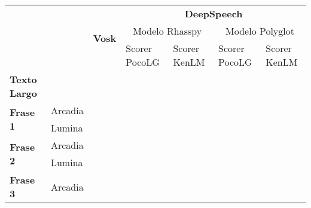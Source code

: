 \documentclass{article}
\begin{document}
	\begin{landscape}
		\begin{table}[]
			\begin{tabular}{|ll|l|llll|}
				\hline
				\multicolumn{2}{|l|}{\multirow{3}{*}{}}                           & \multirow{3}{*}{\textbf{Vosk}} & \multicolumn{4}{c|}{\textbf{DeepSpeech}}                                                                                   \\ \cline{4-7} 
				\multicolumn{2}{|l|}{}                                            &                                & \multicolumn{2}{c|}{Modelo Rhasspy}                                    & \multicolumn{2}{c|}{Modelo Polyglot}              \\ \cline{4-7} 
				\multicolumn{2}{|l|}{}                                            &                                & \multicolumn{1}{l|}{Scorer PocoLG} & \multicolumn{1}{l|}{Scorer KenLM} & \multicolumn{1}{l|}{Scorer PocoLG} & Scorer KenLM \\ \hline
				\multicolumn{1}{|l|}{\textbf{Texto Largo}}              &         &                                & \multicolumn{1}{l|}{}              & \multicolumn{1}{l|}{}             & \multicolumn{1}{l|}{}              &              \\ \hline
				\multicolumn{1}{|l|}{\multirow{2}{*}{\textbf{Frase 1}}} & Arcadia &                                & \multicolumn{1}{l|}{}              & \multicolumn{1}{l|}{}             & \multicolumn{1}{l|}{}              &              \\ \cline{2-7} 
				\multicolumn{1}{|l|}{}                                  & Lumina  &                                & \multicolumn{1}{l|}{}              & \multicolumn{1}{l|}{}             & \multicolumn{1}{l|}{}              &              \\ \hline
				\multicolumn{1}{|l|}{\multirow{2}{*}{\textbf{Frase 2}}} & Arcadia &                                & \multicolumn{1}{l|}{}              & \multicolumn{1}{l|}{}             & \multicolumn{1}{l|}{}              &              \\ \cline{2-7} 
				\multicolumn{1}{|l|}{}                                  & Lumina  &                                & \multicolumn{1}{l|}{}              & \multicolumn{1}{l|}{}             & \multicolumn{1}{l|}{}              &              \\ \hline
				\multicolumn{1}{|l|}{\multirow{2}{*}{\textbf{Frase 3}}} & Arcadia &                                & \multicolumn{1}{l|}{}              & \multicolumn{1}{l|}{}             & \multicolumn{1}{l|}{}              &              \\ \cline{2-7} 

\end{tabular}
\end{table}
\end{landscape}
\end{document}
